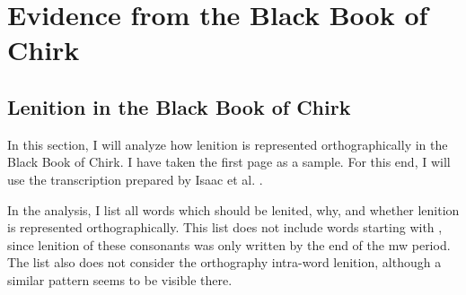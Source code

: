  \chapter{Evidence from the Black Book of Chirk}\label{chirk}

 
 \section{Lenition in the Black Book of Chirk}

 
 In this section, I will analyze how lenition is represented orthographically in the Black Book of Chirk. I have taken the first page as a sample. For this end, I will use the transcription prepared by Isaac et al. \parencite*{isaac_rhyddiaith_2013}.

 



 In the analysis, I list all words which should be lenited, why, and whether lenition is represented orthographically. This list does not include words starting with , since lenition of these consonants was only written by the end of the \gls{mw} period. The list also does not consider the orthography intra-word lenition, although a similar pattern seems to be visible there. 

